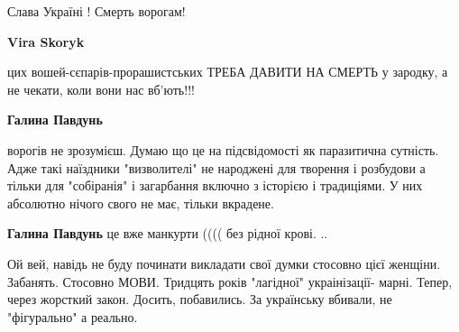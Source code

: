 \begin{itemize}
\begin{itemize}
\begin{itemize}
Слава Україні ! Смерть ворогам!

 
\textbf{Vira Skoryk} 

цих вошей-сєпарів-прорашистських ТРЕБА ДАВИТИ НА СМЕРТЬ у зародку, а не чекати,
коли вони нас вб'ють!!!


 
\textbf{Галина Павдунь} 

ворогів не зрозумієш. Думаю що це на підсвідомості як
паразитична сутність. Адже такі наїздники "визволителі" не народжені для
творення і розбудови а тільки для "собіранія" і загарбання включно з історією і
традиціями. У них абсолютно нічого свого не має, тільки вкрадене.

\end{itemize}

 
\textbf{Галина Павдунь} це вже манкурти (((( без рідної крові. ..

\end{itemize}

 

Ой вей, навідь не буду починати викладати свої думки стосовно цієї женщіни.
Забанять. Стосовно МОВИ. Тридцять років "лагідної" украінізації- марні. Тепер,
через жорсткий закон. Досить, побавились. За українську вбивали, не
"фігурально" а реально.

\begin{itemize}
 


\end{itemize}
\end{itemize}
